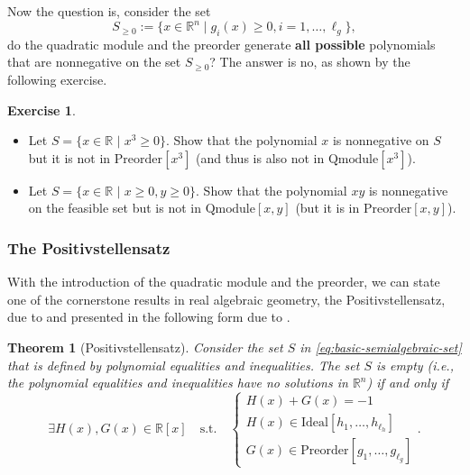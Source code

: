 \documentclass[
]{book}
\newtheorem{theorem}{Theorem}[chapter]
\theoremstyle{definition}
\theoremstyle{definition}
\theoremstyle{definition}
\newtheorem{exercise}{Exercise}[chapter]
\theoremstyle{definition}
\theoremstyle{remark}
\begin{document}
Now the question is, consider the set
\[
S_{\geq 0} := \{ x \in \mathbb{R}^{n} \mid g_i(x) \geq 0, i=1,\dots,\ell_g \},
\]
do the quadratic module and the preorder generate \textbf{all possible} polynomials that are nonnegative on the set \(S_{\geq 0}\)? The answer is no, as shown by the following exercise.

\begin{exercise}
\leavevmode

\begin{itemize}
\item
  Let \(S = \{ x \in \mathbb{R}^{} \mid x^3 \geq 0 \}\). Show that the polynomial \(x\) is nonnegative on \(S\) but it is not in \(\mathrm{Preorder}[x^3]\) (and thus is also not in \(\mathrm{Qmodule}[x^3]\)).
\item
  Let \(S = \{ x \in \mathbb{R}^{}\mid x\geq 0, y\geq 0 \}\). Show that the polynomial \(xy\) is nonnegative on the feasible set but is not in \(\mathrm{Qmodule}[x,y]\) (but it is in \(\mathrm{Preorder}[x,y]\)).
\end{itemize}

\end{exercise}

\subsubsection{The Positivstellensatz}\label{the-positivstellensatz}

With the introduction of the quadratic module and the preorder, we can state one of the cornerstone results in real algebraic geometry, the Positivstellensatz, due to \citep{stengle74ma-nullstellensatz} and presented in the following form due to \citep{bochnak13book-real}.

\begin{theorem}[Positivstellensatz]
\protect\hypertarget{thm:Positivstellensatz}{}\label{thm:Positivstellensatz}Consider the set \(S\) in \eqref{eq:basic-semialgebraic-set} that is defined by polynomial equalities and inequalities. The set \(S\) is empty (i.e., the polynomial equalities and inequalities have no solutions in \(\mathbb{R}^{n}\)) if and only if
\[
\exists H(x), G(x) \in \mathbb{R}[x] \quad \mathrm{s.t.}\quad \begin{cases}
H(x) + G(x) = -1 \\
H(x) \in \mathrm{Ideal}[h_1,\dots,h_{\ell_h}] \\
G(x) \in \mathrm{Preorder}[g_1,\dots,g_{\ell_g}]
\end{cases}.
\]
\end{theorem}
\end{document}
